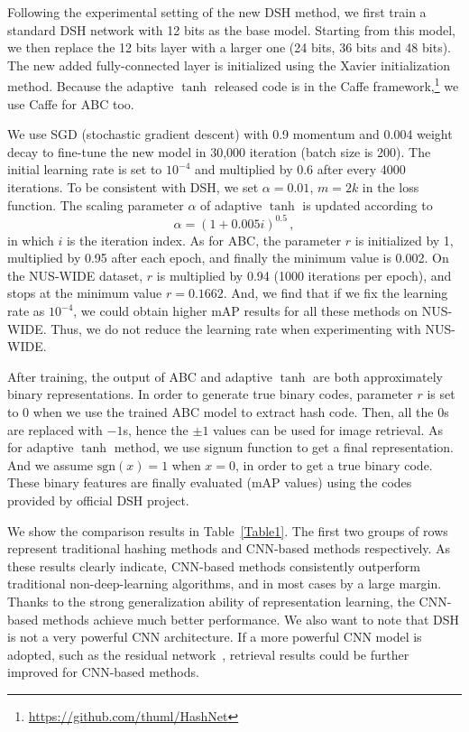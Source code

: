 \documentclass[runningheads]{llncs}
\begin{document}
Following the experimental setting of the new DSH method, we first train a standard DSH network with 12 bits as the base model. Starting from this model, we then replace the 12 bits layer with a larger one (24 bits, 36 bits and 48 bits). The new added fully-connected layer is initialized using the Xavier initialization method. Because the adaptive $\tanh$ released code is in the Caffe framework,\footnote{\url{https://github.com/thuml/HashNet}} we use Caffe for ABC too.

We use SGD (stochastic gradient descent) with 0.9 momentum and 0.004 weight decay to fine-tune the new model in 30,000 iteration (batch size is 200). The initial learning rate is set to $10^{-4}$ and multiplied by 0.6 after every 4000 iterations. To be consistent with DSH, we set $\alpha=0.01$, $m=2k$ in the loss function. The scaling parameter $\alpha$ of adaptive $\tanh$ is updated according to $$\alpha=(1+0.005i)^{0.5} \,,$$ in which $i$ is the iteration index. As for ABC, the parameter $r$ is initialized by 1, multiplied by 0.95 after each epoch, and finally the minimum value is 0.002. On the NUS-WIDE dataset, $r$ is multiplied by 0.94 (1000 iterations per epoch), and stops at the minimum value $r=0.1662$. And, we find that if we fix the learning rate as $10^{-4}$, we could obtain higher mAP results for all these methods on NUS-WIDE. Thus, we do not reduce the learning rate when experimenting with NUS-WIDE.

After training, the output of ABC and adaptive $\tanh$ are both approximately binary representations. In order to generate true binary codes, parameter $r$ is set to $0$ when we use the trained ABC model to extract hash code. Then, all the $0$s are replaced with $-1$s, hence the $\pm 1$ values can be used for image retrieval. As for adaptive $\tanh$ method, we use signum function to get a final representation. And we assume $\text{sgn}(x)=1$ when $x=0$, in order to get a true binary code. These binary features are finally evaluated (mAP values) using the codes provided by official DSH project.

We show the comparison results in Table~\ref{Table1}. The first two groups of rows represent traditional hashing methods and CNN-based methods respectively. As these results clearly indicate, CNN-based methods consistently outperform traditional non-deep-learning algorithms, and in most cases by a large margin. Thanks to the strong generalization ability of representation learning, the CNN-based methods achieve much better performance. We also want to note that DSH is not a very powerful CNN architecture. If a more powerful CNN model is adopted, such as the residual network~\cite{ResNet}, retrieval results could be further improved for CNN-based methods.
\end{document}

